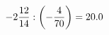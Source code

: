 \documentclass[preview]{standalone}
\begin{document}
\begin{align*}
-2 { 12 \over 14 }  :  \left( - { 4 \over 70 } \right) = 20.0
\end{align*}
\end{document}
